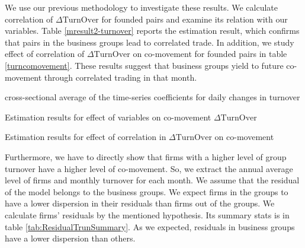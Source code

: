 	We use our previous methodology to investigate these results. We calculate correlation of $ \Delta \text{TurnOver} $ for founded pairs and examine its relation with our variables. Table \ref{mresult2-turnover} reports the estimation result, which confirms that pairs in the business groups lead to correlated trade. In addition, we study effect of  correlation of $ \Delta \text{TurnOver} $ on co-movement for founded pairs in table \ref{turncomovement}. These results suggest that business groups yield to future co-movement through correlated trading in that month.
  
  
  
  
  
  
{\begin{table}[htbp]
	\centering
	\caption{cross-sectional average of the time-series coefficients for daily changes in turnover }
	\resizebox{!}{!}{
		
	} \label{turnover}
\end{table}}


	\begin{table}[htbp]
		\centering
		\caption{Estimation results for effect of variables on  co-movement $ \Delta \text{TurnOver} $}
		\label{mresult2-turnover}
		\resizebox{\textwidth}{!}{
			\centering
			
		}
	\end{table}


	\begin{table}[htbp]
		\centering
		\caption{Estimation results for effect of correlation in $ \Delta \text{TurnOver} $ on  co-movement }
		\label{turncomovement}
		\resizebox{\textwidth}{!}{
			\centering
			
		}
	\end{table}



Furthermore, we have to directly show that firms with a higher level of group turnover have a higher level of co-movement. So, we extract the annual average level of firms and monthly turnover for each month. We assume that the residual of the model belongs to the business groups. We expect firms in the groups to have a lower dispersion in their residuals than firms out of the groups. We calculate firms' residuals by the mentioned hypothesis. Its summary stats is in table \ref{tab:ResidualTrunSummary}. As we expected, residuals in business groups have a lower dispersion than others.


